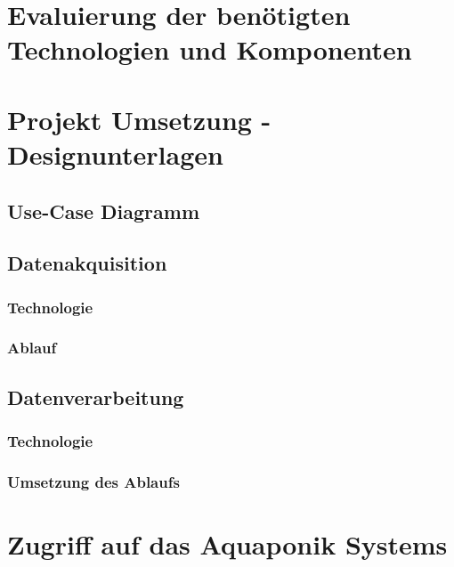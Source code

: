 \documentclass[12pt]{article}
\begin{document}
\newpage %
\section{Evaluierung der benötigten Technologien und Komponenten}


\newpage %
\section{Projekt Umsetzung - Designunterlagen}
%

\subsection{Use-Case Diagramm}
%

\subsection{Datenakquisition}
%

\subsubsection{Technologie}
%

\subsubsection{Ablauf}
%

\subsection{Datenverarbeitung}
%

\subsubsection{Technologie}
%

\subsubsection{Umsetzung des Ablaufs}
%


\newpage %
\section{Zugriff auf das Aquaponik Systems}
%
\end{document}
